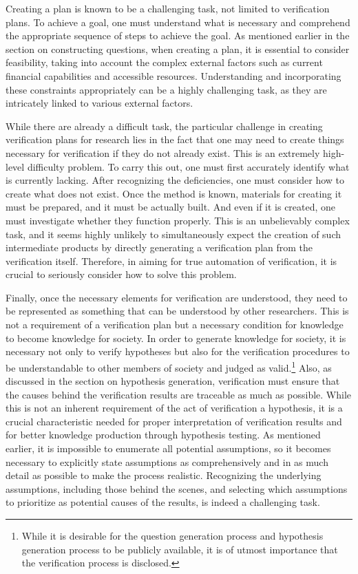 \documentclass{article}
\begin{document}
Creating a plan is known to be a challenging task, not limited to verification plans. To achieve a goal, one must understand what is necessary and comprehend the appropriate sequence of steps to achieve the goal. As mentioned earlier in the section on constructing questions, when creating a plan, it is essential to consider feasibility, taking into account the complex external factors such as current financial capabilities and accessible resources. Understanding and incorporating these constraints appropriately can be a highly challenging task, as they are intricately linked to various external factors.

While there are already a difficult task, the particular challenge in creating verification plans for research lies in the fact that one may need to create things necessary for verification if they do not already exist. This is an extremely high-level difficulty problem. To carry this out, one must first accurately identify what is currently lacking. After recognizing the deficiencies, one must consider how to create what does not exist. Once the method is known, materials for creating it must be prepared, and it must be actually built. And even if it is created, one must investigate whether they function properly. This is an unbelievably complex task, and it seems highly unlikely to simultaneously expect the creation of such intermediate products by directly generating a verification plan from the verification itself. Therefore, in aiming for true automation of verification, it is crucial to seriously consider how to solve this problem.


Finally, once the necessary elements for verification are understood, they need to be represented as something that can be understood by other researchers. This is not a requirement of a verification plan but a necessary condition for knowledge to become knowledge for society. In order to generate knowledge for society, it is necessary not only to verify hypotheses but also for the verification procedures to be understandable to other members of society and judged as valid.\footnote{
While it is desirable for the question generation process and hypothesis generation process to be publicly available, it is of utmost importance that the verification process is disclosed. 
} Also, as discussed in the section on hypothesis generation, verification must ensure that the causes behind the verification results are traceable as much as possible. While this is not an inherent requirement of the act of verification a hypothesis, it is a crucial characteristic needed for proper interpretation of verification results and for better knowledge production through hypothesis testing. As mentioned earlier, it is impossible to enumerate all potential assumptions, so it becomes necessary to explicitly state assumptions as comprehensively and in as much detail as possible to make the process realistic. Recognizing the underlying assumptions, including those behind the scenes, and selecting which assumptions to prioritize as potential causes of the results, is indeed a challenging task.
\end{document}
